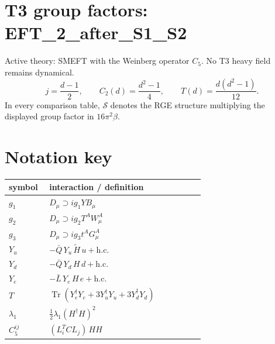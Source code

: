 \documentclass[9pt]{article}
\begin{document}
\section*{T3 group factors: EFT\_2\_after\_S1\_S2}
Active theory: SMEFT with the Weinberg operator $C_5$.  No T3 heavy field remains dynamical.
\[j=\frac{d-1}{2},\qquad C_2(d)=\frac{d^2-1}{4},\qquad T(d)=\frac{d(d^2-1)}{12}.\]
In every comparison table, $\mathcal{S}$ denotes the RGE structure multiplying the displayed group factor in $16\pi^2\beta$.
\section*{Notation key}
\begin{longtable}{@{}p{0.19\linewidth}p{0.73\linewidth}@{}}
\toprule
symbol & interaction / definition \\
\midrule
$g_1$ & $D_\mu\supset i g_1 Y B_\mu$ \\
$g_2$ & $D_\mu\supset i g_2 T^A W_\mu^A$ \\
$g_3$ & $D_\mu\supset i g_3 t^A G_\mu^A$ \\
$Y_u$ & $-\bar Q\,Y_u\,\widetilde H\,u+\mathrm{h.c.}$ \\
$Y_d$ & $-\bar Q\,Y_d\,H\,d+\mathrm{h.c.}$ \\
$Y_e$ & $-\bar L\,Y_e\,H\,e+\mathrm{h.c.}$ \\
$T$ & $\operatorname{Tr}\!\left(Y_e^\dagger Y_e+3Y_u^\dagger Y_u+3Y_d^\dagger Y_d\right)$ \\
$\lambda_1$ & $\frac12\lambda_1(H^\dagger H)^2$ \\
$C_5^{ij}$ & $(L_i^T C L_j)\,H H$ \\
\bottomrule
\end{longtable}
\end{document}
